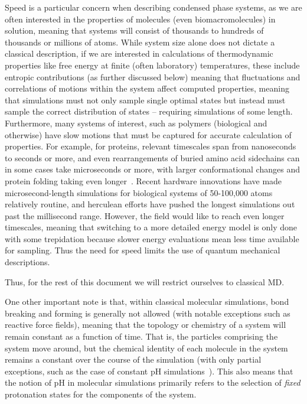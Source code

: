 \documentclass[9pt,bestpractices]{livecoms}
\begin{document}
Speed is a particular concern when describing condensed phase systems, as we are often interested in the properties of molecules (even biomacromolecules) in solution, meaning that systems will consist of thousands to hundreds of thousands or millions of atoms.
While system size alone does not dictate a classical description, if we are interested in calculations of thermodynamic properties like free energy at finite (often laboratory) temperatures, these include entropic contributions (as further discussed below) meaning that fluctuations and correlations of motions within the system affect computed properties, meaning that simulations must not only sample single optimal states but instead must sample the correct distribution of states -- requiring simulations of some length.
Furthermore, many systems of interest, such as polymers (biological and otherwise) have slow motions that must be captured for accurate calculation of properties.
For example, for proteins, relevant timescales span from nanoseconds to seconds or more, and even rearrangements of buried amino acid sidechains can in some cases take microseconds or more, with larger conformational changes and protein folding taking even longer~\cite{Schlick:2010:, Mobley:2012:JComputAidedMolDes}.
Recent hardware innovations have made microsecond-length simulations for biological systems of 50-100,000 atoms relatively routine, and herculean efforts have pushed the longest simulations out past the millisecond range.
However, the field would like to reach even longer timescales, meaning that switching to a more detailed energy model is only done with some trepidation because slower energy evaluations mean less time available for sampling.
Thus the need for speed limits the use of quantum mechanical descriptions.

Thus, for the rest of this document we will restrict ourselves to classical MD.

One other important note is that, within classical molecular simulations, bond breaking and forming is generally not allowed (with notable exceptions such as reactive force fields),  meaning that the topology or chemistry of a system will remain constant as a function of time.
That is, the particles comprising the system move around, but the chemical identity of each molecule in the system remains a constant over the course of the simulation (with only partial exceptions, such as the case of constant pH simulations~\cite{Chen:2014:MolSimul}).
This also means that the notion of pH in molecular simulations primarily refers to the selection of \emph{fixed} protonation states for the components of the system.
\end{document}
